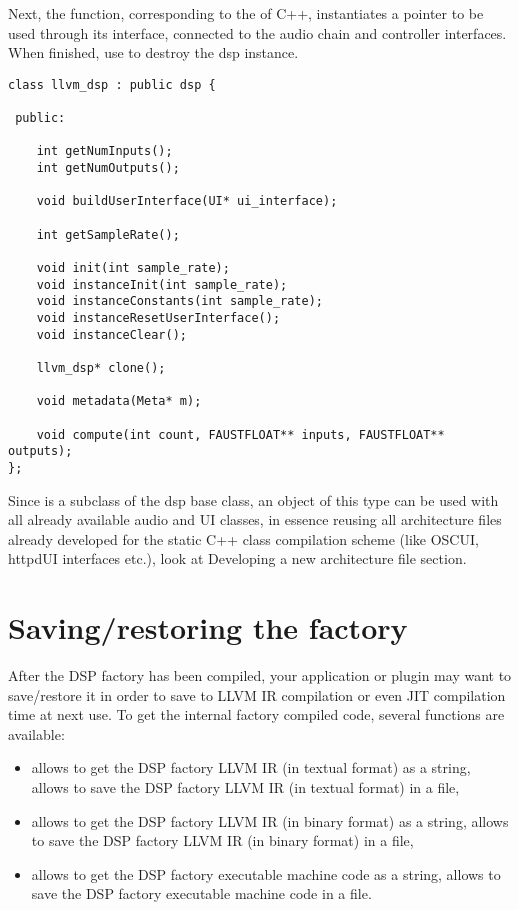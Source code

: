 Next, the  function, corresponding to the  of C++, instantiates a  pointer to be used through its interface, connected to the audio chain and controller interfaces. When finished, use  to destroy the dsp instance.

\begin{lstlisting}
class llvm_dsp : public dsp {
    
 public:
    
    int getNumInputs();    
    int getNumOutputs();
    
    void buildUserInterface(UI* ui_interface);
   
    int getSampleRate();
    
    void init(int sample_rate);  
    void instanceInit(int sample_rate);
    void instanceConstants(int sample_rate);
    void instanceResetUserInterface();  
    void instanceClear();
    
    llvm_dsp* clone();
    
    void metadata(Meta* m);
    
    void compute(int count, FAUSTFLOAT** inputs, FAUSTFLOAT** outputs);
};
\end{lstlisting}

Since  is a subclass of the dsp base class, an object of this type can be used with all already available audio and UI classes, in essence reusing all architecture files already developed for the static C++ class compilation scheme (like OSCUI, httpdUI interfaces etc.), look at Developing a new architecture file section.

\section{Saving/restoring the factory}

After the DSP factory has been compiled, your application or plugin may want to save/restore it in order to save \faust to LLVM IR compilation or even JIT compilation time at next use. To get the internal factory compiled code, several functions are available:

\begin{itemize}
\item  {} allows to get the DSP factory LLVM IR (in textual format) as a string,  allows to save the DSP factory LLVM IR (in textual format) in a file,
\item  {} allows to get the DSP factory LLVM IR (in binary format) as a string,  allows to save the DSP factory LLVM IR (in binary format) in a file,
\item  {} allows to get the DSP factory executable machine code as a string,  allows to save the DSP factory executable machine code in a file.
\end{itemize}

